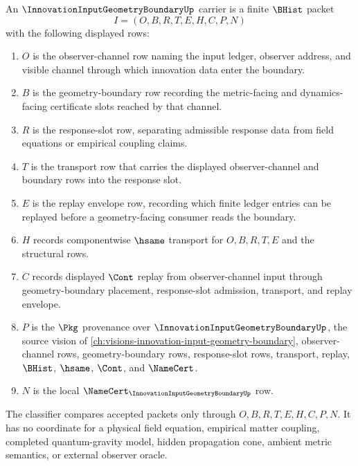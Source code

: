 \begin{definition}
\label{def:innovation-input-geometry-boundary-carrier}
An $\InnovationInputGeometryBoundaryUp$ carrier is a finite $\BHist$ packet
$$
I=(O,B,R,T,E,H,C,P,N)
$$
with the following displayed rows:
\begin{enumerate}
\item $O$ is the observer-channel row naming the input ledger, observer address, and visible channel through which innovation data enter the boundary.
\item $B$ is the geometry-boundary row recording the metric-facing and dynamics-facing certificate slots reached by that channel.
\item $R$ is the response-slot row, separating admissible response data from field equations or empirical coupling claims.
\item $T$ is the transport row that carries the displayed observer-channel and boundary rows into the response slot.
\item $E$ is the replay envelope row, recording which finite ledger entries can be replayed before a geometry-facing consumer reads the boundary.
\item $H$ records componentwise $\hsame$ transport for $O,B,R,T,E$ and the structural rows.
\item $C$ records displayed $\Cont$ replay from observer-channel input through geometry-boundary placement, response-slot admission, transport, and replay envelope.
\item $P$ is the $\Pkg$ provenance over $\InnovationInputGeometryBoundaryUp$, the source vision of \autoref{ch:visions-innovation-input-geometry-boundary}, observer-channel rows, geometry-boundary rows, response-slot rows, transport, replay, $\BHist$, $\hsame$, $\Cont$, and $\NameCert$.
\item $N$ is the local $\NameCert_{\InnovationInputGeometryBoundaryUp}$ row.
\end{enumerate}
The classifier compares accepted packets only through $O,B,R,T,E,H,C,P,N$. It has no coordinate for a physical field equation, empirical matter coupling, completed quantum-gravity model, hidden propagation cone, ambient metric semantics, or external observer oracle.
\end{definition}

